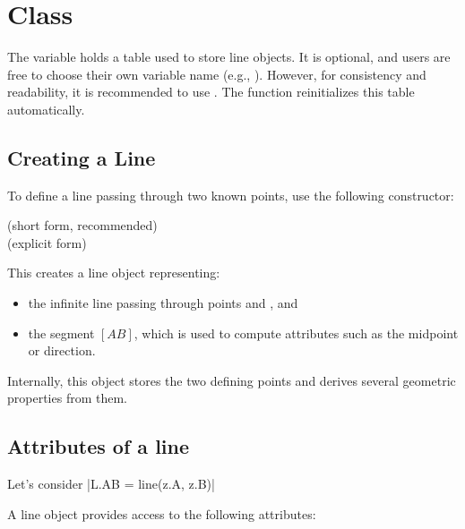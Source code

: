 \newpage
\section{Class } %
\label{sec:class_line}

The variable  holds a table used to store line objects. It is optional, and users are free to choose their own variable name (e.g., ).  
However, for consistency and readability, it is recommended to use . The function  reinitializes this table automatically.

\subsection{Creating a Line} %
\label{sub:creating_a_line}

To define a line passing through two known points, use the following constructor:

\begin{mybox}
   \hfill (short form, recommended)\\
   \hfill (explicit form)
\end{mybox}

This creates a line object  representing:
\begin{itemize}
  \item the infinite line passing through points  and , and
  \item the segment $[AB]$, which is used to compute attributes such as the midpoint or direction.
\end{itemize}

\medskip
\noindent
Internally, this object stores the two defining points and derives several geometric properties from them.



\subsection{Attributes of a line} %
\label{sub:attributes_of_a_line}

Let's consider  |L.AB = line(z.A, z.B)|

A line object provides access to the following attributes:

\vspace{1em}

